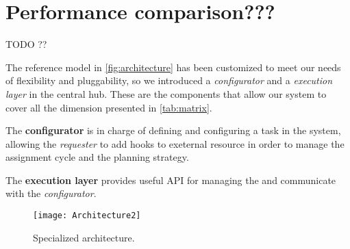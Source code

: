\section{Performance comparison???}
\label{sec:implementation:performance}






























TODO ??

The reference model in \autoref{fig:architecture} has been customized to meet our
needs of flexibility and pluggability, so we introduced a \emph{configurator} and
a \emph{execution layer} in the central hub. These are the components that allow
our system to cover all the dimension presented in \autoref{tab:matrix}.

The \textbf{configurator} is in charge of defining and configuring a task in the
system, allowing the \emph{requester} to add hooks to exeternal resource in order
to manage the assignment cycle and the planning strategy.

The \textbf{execution layer} provides useful API for managing the \utask{} and
communicate with the \emph{configurator}.

\begin{figure}[tb]
    \centering
    \texttt{[image: Architecture2]}
    \caption{Specialized architecture.}
    \label{fig:architecture2}
\end{figure}





